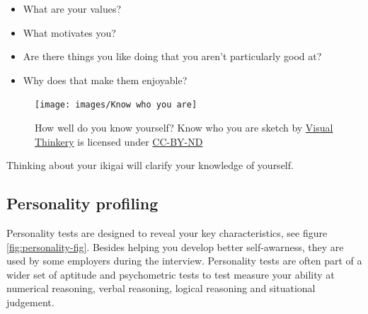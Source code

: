 \documentclass[
]{book}
\providecommand{\tightlist}{%
  \setlength{\itemsep}{0pt}\setlength{\parskip}{0pt}}
\begin{document}
\begin{itemize}
\tightlist
\item
  What are your values?
\item
  What motivates you?
\item
  Are there things you like doing that you aren't particularly good at?
\item
  Why does that make them enjoyable?
\end{itemize}

\begin{figure}

{\centering \texttt{[image: images/Know who you are]} 

}

\caption{How well do you know yourself? Know who you are sketch by \href{https://visualthinkery.com}{Visual Thinkery} is licensed under \href{https://creativecommons.org/licenses/by-nd/4.0/}{CC-BY-ND}}\label{fig:know-fig}
\end{figure}



Thinking about your ikigai will clarify your knowledge of yourself.

\hypertarget{personality}{%
\subsection{Personality profiling}\label{personality}}

Personality tests are designed to reveal your key characteristics, see figure \ref{fig:personality-fig}. Besides helping you develop better self-awarness, they are used by some employers during the interview. Personality tests are often part of a wider set of aptitude and psychometric tests to test measure your ability at numerical reasoning, verbal reasoning, logical reasoning and
situational judgement.
\end{document}
